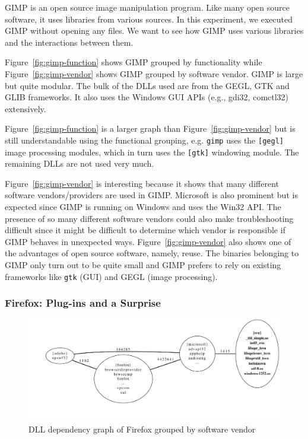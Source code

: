 GIMP is an open source image manipulation program. Like many open source
software, it uses libraries from various sources. In this experiment, we
executed GIMP without opening any files. We want to see how GIMP uses various
libraries and the interactions between them.

Figure~\ref{fig:gimp-function} shows GIMP grouped by functionality while
Figure~\ref{fig:gimp-vendor} shows
GIMP grouped by software vendor.
GIMP is large but quite modular. The bulk of
the DLLs used are from the GEGL, GTK and GLIB frameworks. It also uses the
Windows GUI APIs (e.g., gdi32, comctl32) extensively.

Figure~\ref{fig:gimp-function} is a larger graph than Figure~\ref{fig:gimp-vendor}
but is still understandable using the functional grouping,
e.g. {\tt gimp} uses the {\tt [gegl]}
image processing modules, which in turn uses the {\tt [gtk]} windowing
module.  The remaining DLLs are not used very much.

Figure~\ref{fig:gimp-vendor} is interesting because it shows that
many different software vendors/providers are used in GIMP.
Microsoft is also prominent but is
expected since GIMP is running on Windows and uses the Win32 API.
The presence of so many different software vendors could also make
troubleshooting difficult since it might be difficult to determine
which vendor is responsible if GIMP behaves in unexpected ways.
Figure~\ref{fig:gimp-vendor} also shows
one of the advantages of open source software, namely, reuse. The
binaries belonging to GIMP only turn out to be quite small and
GIMP prefers to rely on
existing frameworks like {\tt gtk} (GUI) and GEGL (image processing).

\subsubsection{Firefox: Plug-ins and a Surprise}

\begin{figure}
\centering
\includegraphics[width=1.0\columnwidth]{depvis/firefox-vendor.pdf}
\caption{DLL dependency graph of Firefox grouped by software vendor}
\label{fig:firefox}
\end{figure}


